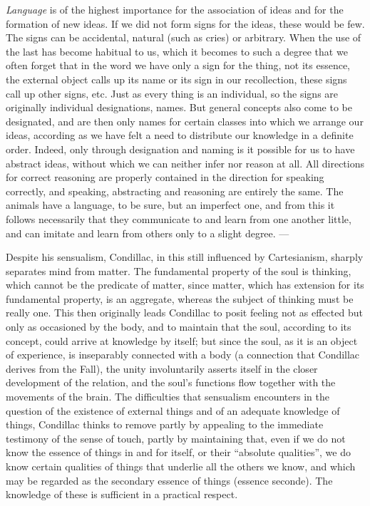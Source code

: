 \emph{Language} is of the highest importance for the association
of ideas and for the formation of new ideas. If we did not form signs
for the ideas, these would be few. The signs can be accidental, natural
(such as cries) or arbitrary. When the use of the last has become
habitual to us, which it becomes to such a degree that we often forget
that in the word we have only a sign for the thing, not its essence,
the external object calls up its name or its sign in our recollection,
these signs call up other signs, etc. Just as every thing is an
individual, so the signs are originally individual designations, names.
But general concepts also come to be designated, and are then only
names for certain classes into which we arrange our ideas, according as
we have felt a need to distribute our knowledge in a definite order.
Indeed, only through designation and naming is it possible for us to
have abstract ideas, without which we can neither infer nor reason at
all. All directions for correct reasoning are properly contained in the
direction for speaking correctly, and speaking, abstracting and
reasoning are entirely the same. The animals have a language, to be
sure, but an imperfect one, and from this it follows necessarily that
they communicate to and learn from one another little, and can imitate
and learn from others only to a slight degree. ---

Despite his sensualism, Condillac, in this still influenced by
Cartesianism, sharply separates mind from matter. The fundamental
property of the soul is thinking, which cannot be the predicate of
matter, since matter, which has extension for its fundamental property,
is an aggregate, whereas the subject of thinking must be really one.
This then originally leads Condillac to posit feeling not as effected
but only as occasioned by the body, and to maintain that the soul,
according to its concept, could arrive at knowledge by itself; but since
the soul, as it is an object of experience, is inseparably connected
with a body (a connection that Condillac derives from the Fall), the
unity involuntarily asserts itself in the closer development of the
relation, and the soul's functions flow together with the
movements of the brain. The difficulties that sensualism encounters in
the question of the existence of external things and of an adequate
knowledge of things, Condillac thinks to remove partly by appealing to
the immediate testimony of the sense of touch, partly by maintaining
that, even if we do not know the essence of things in and for itself,
or their ``absolute qualities'', we do know certain qualities of things
that underlie all the others we know, and which may be regarded as the
secondary essence of things (essence seconde). The knowledge of these
is sufficient in a practical respect.

